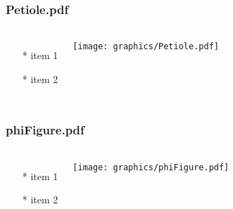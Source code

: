 \begin{frame} \frametitle{Petiole.pdf}
    \begin{columns}[c]
        \begin{itemize}
            \item[*] item 1
            \item[*] item 2
        \end{itemize}
        \begin{minipage}{\linewidth}
            \begin{center}
            \texttt{[image: graphics/Petiole.pdf]}
            \label{gfx:Petiole.pdf}
            \end{center}
        \end{minipage}
    \end{columns}
\end{frame}
\begin{frame} \frametitle{phiFigure.pdf}
    \begin{columns}[c]
        \begin{itemize}
            \item[*] item 1
            \item[*] item 2
        \end{itemize}
        \begin{minipage}{\linewidth}
            \begin{center}
            \texttt{[image: graphics/phiFigure.pdf]}
            \label{gfx:phiFigure.pdf}
            \end{center}
        \end{minipage}
    \end{columns}
\end{frame}
